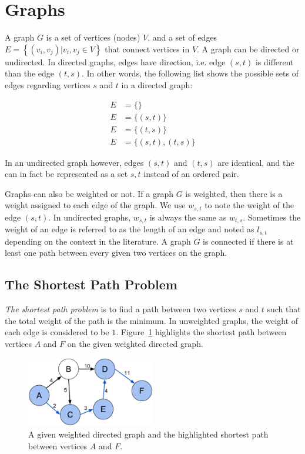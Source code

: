 \section{Graphs}
A graph $G$ is a set of vertices (nodes) $V$, and a set of edges $E=\left\{(v_i, v_j) | v_i, v_j \in V\right\}$ that connect vertices in $V$. A graph can be directed or undirected. In directed graphs, edges have direction, i.e. edge $(s, t)$ is different than the edge $(t, s)$. In other words, the following list shows the possible sets of edges regarding vertices $s$ and $t$ in a directed graph:

\begin{align}
  E &= \{\} \nonumber \\
  E &= \{(s, t)\} \nonumber \\
  E &= \{(t, s)\} \nonumber \\
  E &= \{(s, t), (t, s)\}
\end{align}

In an undirected graph however, edges $(s, t)$ and $(t, s)$ are identical, and the can in fact be represented as a set ${s, t}$ instead of an ordered pair.

Graphs can also be weighted or not. If a graph $G$ is weighted, then there is a weight assigned to each edge of the graph. We use $w_{s,t}$ to note the weight of the edge $(s,t)$. In undirected graphs, $w_{s, t}$ is always the same as $w_{t, s}$. Sometimes the weight of an edge is referred to as the length of an edge and noted as $l_{s,t}$ depending on the context in the literature.
A graph $G$ is connected if there is at least one path between every given two vertices on the graph.

\subsection{The Shortest Path Problem}
\emph{The shortest path problem} is to find a path between two vertices $s$ and $t$ such that the total weight of the path is the minimum. In unweighted graphs, the weight of each edge is considered to be $1$. Figure~\ref{fig:shortest-path1} highlights the shortest path between vertices $A$ and $F$ on the given weighted directed graph.

\begin{figure}[!ht]
  \centering
  \includegraphics[width=0.5\textwidth]{figs/background/Shortest_path_with_direct_weights}
  \caption{A given weighted directed graph and the highlighted shortest path between vertices $A$ and $F$.}
  \label{fig:shortest-path1}
\end{figure}


